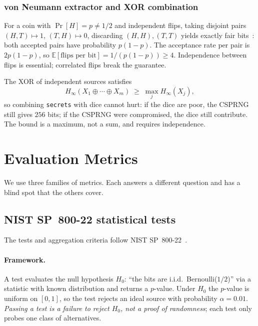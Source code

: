 \documentclass[11pt,a4paper]{article}
\theoremstyle{plain}
\theoremstyle{definition}
\newcommand{\Hmin}{H_\infty}
\begin{document}
\subsubsection{von Neumann extractor and XOR combination}

For a coin with $\Pr[H]=p\neq1/2$ and independent flips, taking disjoint pairs
$(H,T)\mapsto1$, $(T,H)\mapsto0$, discarding $(H,H),(T,T)$ yields exactly fair
bits~\cite{vn51}: both accepted pairs have probability $p(1-p)$. The
acceptance rate per pair is $2p(1-p)$, so $\mathbb{E}[\text{flips per bit}]=1/(p(1-p))\ge4$.
Independence between flips is essential; correlated flips break the guarantee.

The XOR of independent sources satisfies
\begin{equation}
    \Hmin(X_1\oplus\cdots\oplus X_m)\;\ge\;\max_j\Hmin(X_j),
\end{equation}
so combining \texttt{secrets} with dice cannot hurt: if the dice are poor, the
CSPRNG still gives $256$ bits; if the CSPRNG were compromised, the dice still
contribute. The bound is a maximum, not a sum, and requires independence.

\section{Evaluation Metrics}\label{sec:metrics}

We use three families of metrics. Each answers a different question and has a
blind spot that the others cover.

\subsection{NIST SP~800-22 statistical tests}\label{sec:nist}
The tests and aggregation criteria follow NIST SP~800-22~\cite{sp22}.

\paragraph{Framework.} A test evaluates the null hypothesis $H_0$: ``the bits
are i.i.d.\ Bernoulli($1/2$)'' via a statistic with known distribution and
returns a $p$-value. Under $H_0$ the $p$-value is uniform on $[0,1]$, so the
test rejects an ideal source with probability $\alpha=0.01$. \emph{Passing a
test is a failure to reject $H_0$, not a proof of randomness}; each test only
probes one class of alternatives.
\end{document}
